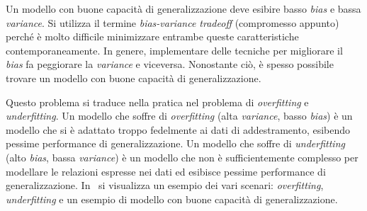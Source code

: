 Un modello con buone capacità di generalizzazione deve esibire basso \emph{bias} e bassa \emph{variance}. Si utilizza il termine \emph{bias-variance tradeoff} (compromesso appunto) perché è molto difficile minimizzare entrambe queste caratteristiche contemporaneamente. In genere, implementare delle tecniche per migliorare il \emph{bias} fa peggiorare la \emph{variance} e viceversa.
Nonostante ciò, è spesso possibile trovare un modello con buone capacità di generalizzazione. 

Questo problema si traduce nella pratica nel problema di \emph{overfitting} e \emph{underfitting}.
Un modello che soffre di \emph{overfitting} (alta \emph{variance}, basso \emph{bias}) è un modello che si è adattato troppo fedelmente ai dati di addestramento, esibendo pessime performance di generalizzazione. 
Un modello che soffre di \emph{underfitting} (alto \emph{bias}, bassa \emph{variance}) è un modello che non è sufficientemente complesso per modellare le relazioni espresse nei dati ed esibisce pessime performance di generalizzazione.
In~ si visualizza un esempio dei vari scenari: \emph{overfitting}, \emph{underfitting} e un esempio di modello con buone capacità di generalizzazione.
